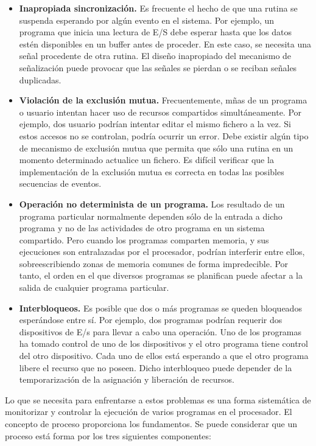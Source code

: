 \documentclass{article}
\begin{document}
				\begin{itemize}
				\item \textbf{Inapropiada sincronización.} Es frecuente el hecho de que una rutina se suspenda esperando por algún evento en el sistema. Por ejemplo, un programa que inicia una lectura de E/S debe esperar hasta que los datos estén disponibles en un buffer antes de proceder. En este caso, se necesita una señal procedente de otra rutina. El diseño inapropiado del mecanismo de señalización puede provocar que las señales se pierdan o se reciban señales duplicadas.
				\item \textbf{Violación de la exclusión mutua.} Frecuentemente, mñas de un programa o usuario intentan hacer uso de recursos compartidos simultáneamente. Por ejemplo, dos usuario podrían intentar editar el mismo fichero a la vez. Si estos accesos no se controlan, podría ocurrir un error. Debe existir algún tipo de mecanismo de exclusión mutua que permita que sólo una rutina en un momento determinado actualice un fichero. Es difícil verificar que la implementación de la exclusión mutua es correcta en todas las posibles secuencias de eventos.
				\item \textbf{Operación no determinista de un programa.} Los resultado de un programa particular normalmente dependen sólo de la entrada a dicho programa y no de las actividades de otro programa en un sistema compartido. Pero cuando los programas comparten memoria, y sus ejecuciones son entralazadas por el procesador, podrían interferir entre ellos, sobreescribiendo zonas de memoria comunes de forma impredecible. Por tanto, el orden en el que diversos programas se planifican puede afectar a la salida de cualquier programa particular.
				
				\item \textbf{Interbloqueos.} Es posible que dos o más programas se queden bloqueados esperándose entre sí. Por ejemplo, dos programas podrían requerir dos dispositivos de E/s para llevar a cabo una operación. Uno de los programas ha tomado control de uno de los dispositivos y el otro programa tiene control del otro dispositivo. Cada uno de ellos está esperando a que el otro programa libere el recurso que no poseen. Dicho interbloqueo puede depender de la temporarización de la asignación y liberación de recursos.
				\end{itemize}
				
				Lo que se necesita para enfrentarse a estos problemas es una forma sistemática de monitorizar y controlar la ejecución de varios programas en el procesador. El concepto de proceso proporciona los fundamentos. Se puede considerar que un proceso está forma por los tres siguientes componentes:
				
\end{document}
